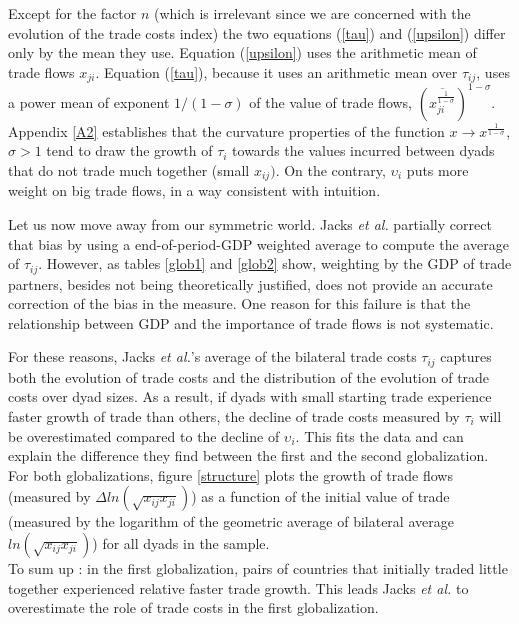 \documentclass{article}
\begin{document}
Except for the factor $n$ (which is irrelevant since we are concerned with the evolution of the trade costs index) the two equations (\ref{tau}) and (\ref{upsilon}) differ only by the mean they use.
Equation (\ref{upsilon}) uses the arithmetic mean of trade flows $x_{ji}$. Equation (\ref{tau}), because it uses an arithmetic mean over $\tau_{ij}$, uses a power mean of exponent  $1/(1-\sigma)$ of the value of trade flows, $\left(\overline{x_{ji}^{\frac{1}{1-\sigma}}}\right)^{1-\sigma}$.
Appendix \ref{A2} establishes that the curvature properties of the function $x \rightarrow x^{\frac{1}{1-\sigma}}$, $\sigma>1$ tend to draw the growth of $\tau_i$ towards the values incurred between dyads that do not trade much together (small $x_{ij})$.
On the contrary, $\upsilon_i$ puts more weight on big trade flows, in a way consistent with intuition.

Let us now move away from our symmetric world. Jacks  \textit{et al.} partially correct that bias by using a end-of-period-GDP weighted average to compute the average of  $\tau_{ij}$.
However, as tables \ref{glob1} and \ref{glob2} show, weighting by the GDP of trade partners, besides not being theoretically justified, does not provide an accurate correction of the bias in the measure.
One reason for this failure is that the relationship between GDP and the importance of trade flows is not systematic.

For these reasons, Jacks  \textit{et al.}'s average of the bilateral trade costs $\tau_{ij}$ captures both the evolution of trade costs and the distribution of the evolution of trade costs over dyad sizes.
As a result, if dyads with small starting trade experience faster growth of trade than others, the decline of trade costs measured by $\tau_i$ will be overestimated compared to the decline of $\upsilon_i$.
This fits the data and can explain the difference they find between the first and the second globalization. For both globalizations, figure \ref{structure} plots the growth of trade flows (measured by $\Delta ln (\sqrt{x_{ij} x_{ji}})$) as a function of the initial value of trade (measured by the logarithm of the geometric average of bilateral average $ln(\sqrt{x_{ij} x_{ji}})$) for all dyads in the sample.\\

To sum up : in the first globalization, pairs of countries that initially traded little together experienced relative faster trade growth. This leads Jacks  \textit{et al.} to overestimate the role of trade costs in the first globalization.
\end{document}

